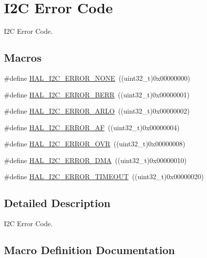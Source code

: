 \hypertarget{group___i2_c___error___code}{}\section{I2C Error Code}
\label{group___i2_c___error___code}


I2C Error Code.  


\subsection*{Macros}
\begin{DoxyCompactItemize}
\item 
\#define \hyperlink{group___i2_c___error___code_ga0b8ca289091d942032c89484b6211d0d}{H\+A\+L\+\_\+\+I2\+C\+\_\+\+E\+R\+R\+O\+R\+\_\+\+N\+O\+NE}~((uint32\+\_\+t)0x00000000)
\item 
\#define \hyperlink{group___i2_c___error___code_gab9f6e39431ee764ada50fd63f0ad2fbf}{H\+A\+L\+\_\+\+I2\+C\+\_\+\+E\+R\+R\+O\+R\+\_\+\+B\+E\+RR}~((uint32\+\_\+t)0x00000001)
\item 
\#define \hyperlink{group___i2_c___error___code_ga048b36222884bfe80ce2d37fa868690b}{H\+A\+L\+\_\+\+I2\+C\+\_\+\+E\+R\+R\+O\+R\+\_\+\+A\+R\+LO}~((uint32\+\_\+t)0x00000002)
\item 
\#define \hyperlink{group___i2_c___error___code_gad1cc236ad6ba5cafe66aecb0dbedc65a}{H\+A\+L\+\_\+\+I2\+C\+\_\+\+E\+R\+R\+O\+R\+\_\+\+AF}~((uint32\+\_\+t)0x00000004)
\item 
\#define \hyperlink{group___i2_c___error___code_ga38d8f9beb4c681eba786f6154d4f594a}{H\+A\+L\+\_\+\+I2\+C\+\_\+\+E\+R\+R\+O\+R\+\_\+\+O\+VR}~((uint32\+\_\+t)0x00000008)
\item 
\#define \hyperlink{group___i2_c___error___code_gae1091e9e82dcfcfef247b214a11c9db3}{H\+A\+L\+\_\+\+I2\+C\+\_\+\+E\+R\+R\+O\+R\+\_\+\+D\+MA}~((uint32\+\_\+t)0x00000010)
\item 
\#define \hyperlink{group___i2_c___error___code_gaeb3bedf36d78ddf3284a68494ab9d089}{H\+A\+L\+\_\+\+I2\+C\+\_\+\+E\+R\+R\+O\+R\+\_\+\+T\+I\+M\+E\+O\+UT}~((uint32\+\_\+t)0x00000020)
\end{DoxyCompactItemize}


\subsection{Detailed Description}
I2C Error Code. 



\subsection{Macro Definition Documentation}
